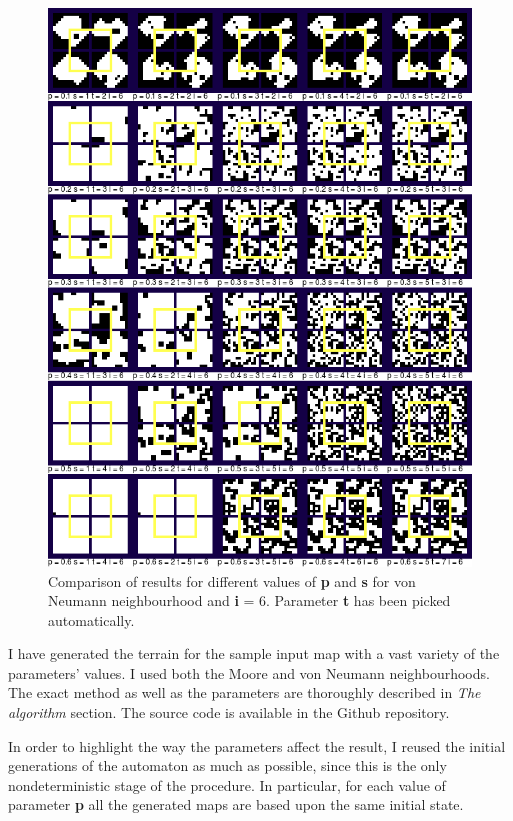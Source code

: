 \documentclass[a4paper, 11pt]{article} %
\begin{document}
\begin{figure}[ht]
        \centering
        \includegraphics[width=1.\textwidth]{neumann_sp}
	\caption{Comparison of results for different values of \textbf{p} and \textbf{s} for von Neumann neighbourhood and \textbf{i} = 6. Parameter \textbf{t} has been picked automatically.}
	\label{fig:results4}
\end{figure}

I have generated the terrain for the sample input map with a vast variety of the parameters' values. I used both the Moore and von Neumann neighbourhoods. The exact method as well as the parameters are thoroughly described in \emph{The algorithm} section. The source code is available in the Github repository.\cite{repo}

In order to highlight the way the parameters affect the result, I reused the initial generations of the automaton as much as possible, since this is the only nondeterministic stage of the procedure. In particular, for each value of parameter \textbf{p} all the generated maps are based upon the same initial state.
\end{document}
